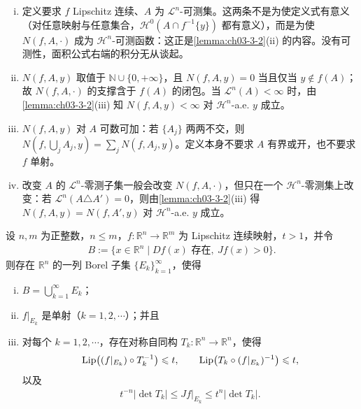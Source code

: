\documentclass[../../main.tex]{subfiles}%
\begin{document}
\begin{remark}\label{remark:ch03-def-3-7-条件}
\begin{enumerate}[(i)]
\item 定义要求 $f$ Lipschitz 连续、$A$ 为 $\mathcal{L}^n$-可测集。这两条不是为使定义式有意义（对任意映射与任意集合，$\mathcal{H}^0(A\cap f^{-1}\{y\})$ 都有意义），而是为使 $N(f,A,\cdot)$ 成为 $\mathcal{H}^n$-可测函数：这正是\cref{lemma:ch03-3-2}(ii) 的内容。没有可测性，面积公式右端的积分无从谈起。%
\item $N(f,A,y)$ 取值于 $\mathbb{N}\cup\{0,+\infty\}$，且 $N(f,A,y)=0$ 当且仅当 $y\notin f(A)$；故 $N(f,A,\cdot)$ 的支撑含于 $f(A)$ 的闭包。当 $\mathcal{L}^n(A)<\infty$ 时，由\cref{lemma:ch03-3-2}(iii) 知 $N(f,A,y)<\infty$ 对 $\mathcal{H}^n$-a.e. $y$ 成立。%
\item $N(f,A,y)$ 对 $A$ 可数可加：若 $\{A_j\}$ 两两不交，则 $N(f,\bigcup_jA_j,y)=\sum_jN(f,A_j,y)$。定义本身不要求 $A$ 有界或开，也不要求 $f$ 单射。
\item 改变 $A$ 的 $\mathcal{L}^n$-零测子集一般会改变 $N(f,A,\cdot)$，但只在一个 $\mathcal{H}^n$-零测集上改变：若 $\mathcal{L}^n(A\triangle A')=0$，则由\cref{lemma:ch03-3-2}(iii) 得 $N(f,A,y)=N(f,A',y)$ 对 $\mathcal{H}^n$-a.e. $y$ 成立。%
\end{enumerate}
\end{remark}

\begin{lemma}\label{lemma:ch03-3-3}
设 $n,m$ 为正整数，$n\leqslant m$，$f:\mathbb{R}^n\to\mathbb{R}^m$ 为 Lipschitz 连续映射，$t>1$，并令
\begin{align*}
B:=\{x\in\mathbb{R}^n\mid Df(x)\text{ 存在},\ Jf(x)>0\}.
\end{align*}
则存在 $\mathbb{R}^n$ 的一列 Borel 子集 $\{E_k\}_{k=1}^{\infty}$，使得
\begin{enumerate}[(i)]
\item $B=\bigcup_{k=1}^{\infty}E_k$；
\item $f|_{E_k}$ 是单射（$k=1,2,\cdots$）；并且
\item 对每个 $k=1,2,\cdots$，存在对称自同构 $T_k:\mathbb{R}^n\to\mathbb{R}^n$，使得
\begin{align*}
\operatorname{Lip}\bigl((f|_{E_k})\circ T_k^{-1}\bigr)\leqslant t,\qquad \operatorname{Lip}\bigl(T_k\circ(f|_{E_k})^{-1}\bigr)\leqslant t,
\end{align*}
以及
\begin{align*}
t^{-n}\lvert\det T_k\rvert\leqslant Jf|_{E_k}\leqslant t^n\lvert\det T_k\rvert .
\end{align*}
\end{enumerate}
\end{lemma}
\end{document}
